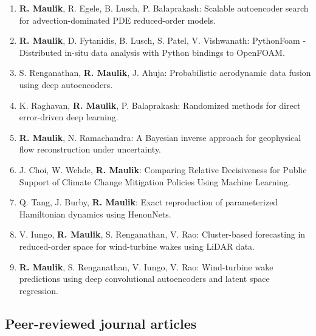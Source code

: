 \documentclass[letterpaper]{article}
\begin{document}
\begin{enumerate}

\item \textbf{R. Maulik}, R. Egele, B. Lusch, P. Balaprakash: Scalable autoencoder search for advection-dominated PDE reduced-order models.

\item \textbf{R. Maulik}, D. Fytanidis, B. Lusch, S. Patel, V. Vishwanath: PythonFoam - Distributed in-situ data analysis with Python bindings to OpenFOAM.

\item S. Renganathan, \textbf{R. Maulik}, J. Ahuja: Probabilistic aerodynamic data fusion using deep autoencoders.

\item K. Raghavan, \textbf{R. Maulik}, P. Balaprakash: Randomized methods for direct error-driven deep learning.

\item \textbf{R. Maulik}, N. Ramachandra: A Bayesian inverse approach for geophysical flow reconstruction under uncertainty.

\item J. Choi, W. Wehde, \textbf{R. Maulik}: Comparing Relative Decisiveness for Public Support of Climate Change Mitigation Policies Using Machine Learning.

\item Q. Tang, J. Burby, \textbf{R. Maulik}: Exact reproduction of parameterized Hamiltonian dynamics using HenonNets.

\item V. Iungo, \textbf{R. Maulik}, S. Renganathan, V. Rao: Cluster-based forecasting in reduced-order space for wind-turbine wakes using LiDAR data.

\item \textbf{R. Maulik}, S. Renganathan, V. Iungo, V. Rao: Wind-turbine wake predictions using deep convolutional autoencoders and latent space regression.

\end{enumerate}


\subsection*{Peer-reviewed journal articles}
\end{document}
